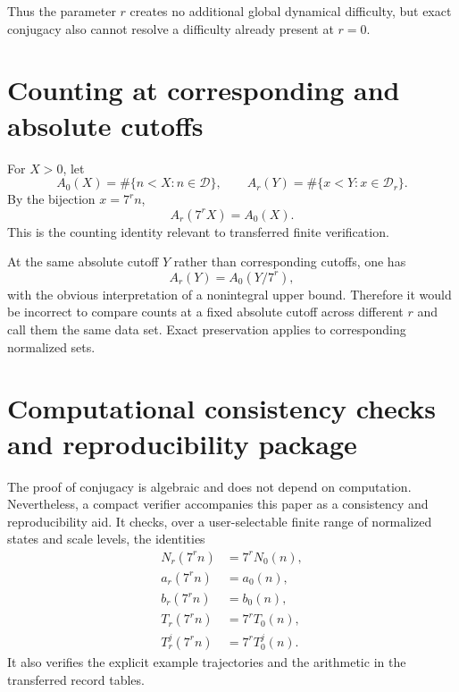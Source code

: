 \documentclass[11pt]{article}
\begin{document}
Thus the parameter $r$ creates no additional global dynamical difficulty, but exact conjugacy also cannot resolve a difficulty already present at $r=0$.

\section{Counting at corresponding and absolute cutoffs}
For $X>0$, let
\[
A_0(X)=\#\{n<X:n\in\mathcal D\},
\qquad
A_r(Y)=\#\{x<Y:x\in\mathcal D_r\}.
\]
By the bijection $x=7^rn$,
\begin{equation}
A_r(7^rX)=A_0(X).
\label{eq:countcorrespond}
\end{equation}
This is the counting identity relevant to transferred finite verification.

At the same absolute cutoff $Y$ rather than corresponding cutoffs, one has
\begin{equation}
A_r(Y)=A_0(Y/7^r),
\label{eq:absolute_count}
\end{equation}
with the obvious interpretation of a nonintegral upper bound. Therefore it would be incorrect to compare counts at a fixed absolute cutoff across different $r$ and call them the same data set. Exact preservation applies to corresponding normalized sets.

\section{Computational consistency checks and reproducibility package}
The proof of conjugacy is algebraic and does not depend on computation. Nevertheless, a compact verifier accompanies this paper as a consistency and reproducibility aid. It checks, over a user-selectable finite range of normalized states and scale levels, the identities
\begin{align}
N_r(7^rn)&=7^rN_0(n),\\
a_r(7^rn)&=a_0(n),\\
b_r(7^rn)&=b_0(n),\\
T_r(7^rn)&=7^rT_0(n),\\
T_r^j(7^rn)&=7^rT_0^j(n).
\end{align}
It also verifies the explicit example trajectories and the arithmetic in the transferred record tables.
\end{document}
